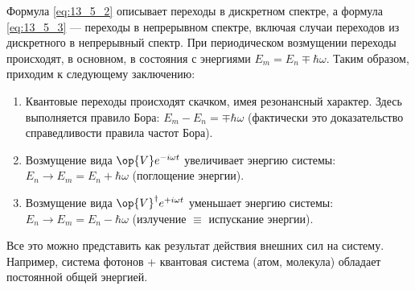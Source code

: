 Формула \eqref{eq:13_5_2} описывает переходы в дискретном спектре, а формула \eqref{eq:13_5_3} --- переходы в непрерывном спектре, включая случаи переходов из дискретного в непрерывный спектр. При периодическом возмущении переходы происходят, в основном, в состояния с энергиями $E_m = E_n \mp \hbar \omega$. Таким образом, приходим к следующему заключению:
\begin{enumerate}
\item Квантовые переходы происходят скачком, имея резонансный характер. Здесь выполняется правило Бора: $E_m - E_n = \mp \hbar \omega$ (фактически это доказательство справедливости правила частот Бора).

\item Возмущение вида $\op{V} e^{-i \omega t}$ увеличивает энергию системы: $E_n \to E_m = E_n + \hbar \omega$ (поглощение энергии).

\item Возмущение вида $\op{V}^\dag e^{+i \omega t}$ уменьшает энергию системы: $E_n \to E_m = E_n - \hbar \omega$ (излучение $\equiv$ испускание энергии).
\end{enumerate}

Все это можно представить как результат действия внешних сил на систему. Например, система фотонов + квантовая система (атом, молекула) обладает постоянной общей энергией.
